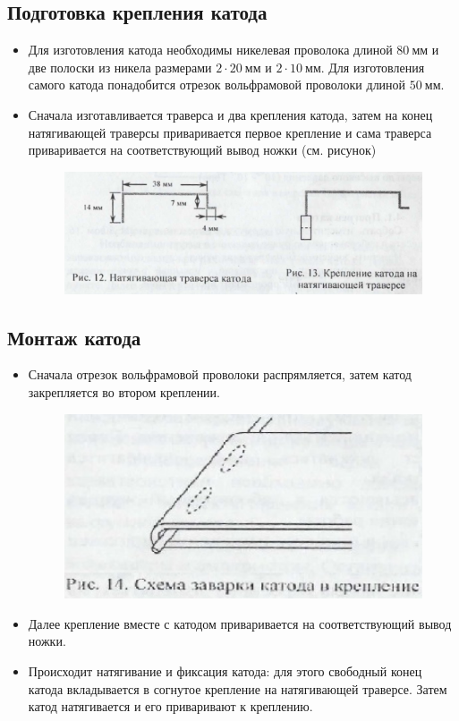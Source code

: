 \documentclass[a4paper]{article}
\begin{document}
\subsection{Подготовка крепления катода}
\begin{itemize}
    \item Для изготовления катода необходимы никелевая проволока длиной $80~\text{мм}$ и две полоски из никела размерами $2 \cdot 20~\text{мм}$ и  $2 \cdot 10~\text{мм}$. Для изготовления самого катода понадобится отрезок вольфрамовой проволоки длиной $50~\text{мм}$.
    \item Сначала изготавливается траверса и два крепления катода, затем на конец натягивающей траверсы приваривается первое крепление и сама траверса приваривается на соответствующий вывод ножки (см. рисунок)
\begin{figure}[h]
\begin{center}
\includegraphics[width=13cm]{натягивающая траверса катода.jpg}
\end{center}
\end{figure}
\end{itemize}
\subsection{Монтаж катода}
\begin{itemize}
    \item Сначала отрезок вольфрамовой проволоки распрямляется, затем катод закрепляется во втором креплении.
\begin{figure}[h]
\begin{center}
\includegraphics[width=13cm]{заварка катода.jpg}
\end{center}
\end{figure}
    \item Далее крепление вместе с катодом приваривается на соответствующий вывод ножки.
    \item Происходит натягивание и фиксация катода: для этого свободный конец катода вкладывается в согнутое крепление на натягивающей траверсе. Затем катод натягивается и его приваривают к креплению.
\end{itemize}
\end{document}
